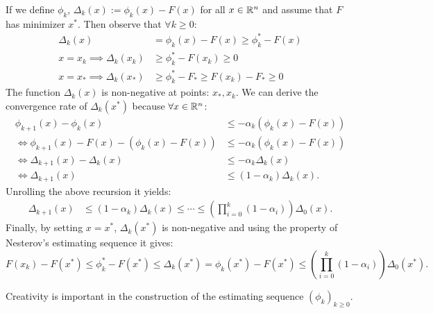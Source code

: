 \documentclass[12pt]{article}
\begin{document}
        \begin{observation} 
            If we define $\phi_k$, $\Delta_k(x) := \phi_k (x) - F(x)$ for all $x \in \mathbb R^n$ and assume that $F$ has minimizer $x^*$. 
            Then observe that $\forall k \ge 0$:  
            \begin{align*}
                \Delta_k(x) 
                &= \phi_k(x) - F(x) \ge \phi_k^* - F(x)
                \\
                x = x_k\implies 
                \Delta_k(x_k) 
                &\ge 
                \phi_k^* - F(x_k) \ge 0
                \\
                x = x_* \implies 
                \Delta_k(x_*)
                &\ge \phi_k^* - F_* \ge F(x_k) - F_* \ge 0
            \end{align*}
            The function $\Delta_k(x)$ is non-negative at points: $x_*, x_k$.
            We can derive the convergence rate of $\Delta_k(x^*)$ because $\forall x \in \mathbb R^n$: 
            \begin{align*}
                \phi_{k + 1}(x) - \phi_k(x) 
                &\le - \alpha_k (\phi_k(x) - F(x))
                \\
                \iff 
                \phi_{k + 1}(x) - F(x) - (\phi_k(x) - F(x))
                &\le 
                -\alpha_k(\phi_k(x) - F(x))
                \\
                \iff
                \Delta_{k + 1}(x) - \Delta_k(x) &\le
                - \alpha_k\Delta_k(x)
                \\
                \iff 
                \Delta_{k + 1}(x) 
                &\le 
                (1 - \alpha_k)\Delta_k(x). 
            \end{align*}
            Unrolling the above recursion it yields: 
            \begin{align*}
                \Delta_{k + 1}(x) &\le 
                (1 - \alpha_k)\Delta_k(x) \le \cdots \le 
                \left(
                    \prod_{i = 0}^k(1 - \alpha_i)
                \right)\Delta_0(x). 
            \end{align*}
            Finally, by setting $x = x^*$, $\Delta_k(x^*)$ is non-negative and using the property of Nesterov's estimating sequence it gives: 
            $$
                F(x_k) - F(x^*) \le \phi_k^* - F(x^*) \le \Delta_k(x^*) = \phi_k(x^*) - F(x^*) \le \left(\prod_{i = 0}^k(1 - \alpha_i)\right)\Delta_0(x^*).
            $$ 
        \end{observation}
        Creativity is important in the construction of the estimating sequence $(\phi_k)_{k \ge 0}$. 
\end{document}

